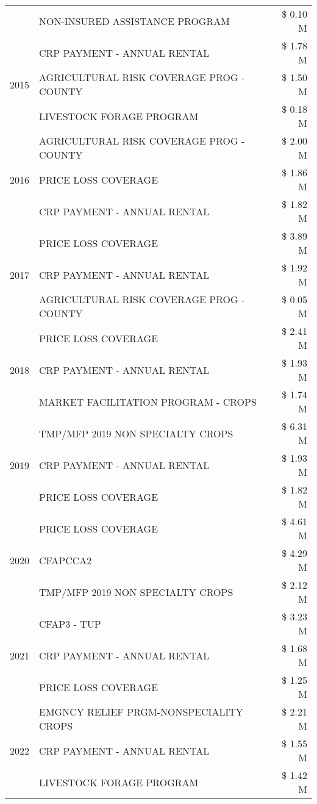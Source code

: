 \begin{tabular}{llr}
 & NON-INSURED ASSISTANCE PROGRAM & \$ 0.10 M \\
\cline{1-3}
\multirow[t]{3}{*}{2015} & CRP PAYMENT - ANNUAL RENTAL & \$ 1.78 M \\
 & AGRICULTURAL RISK COVERAGE PROG - COUNTY & \$ 1.50 M \\
 & LIVESTOCK FORAGE PROGRAM & \$ 0.18 M \\
\cline{1-3}
\multirow[t]{3}{*}{2016} & AGRICULTURAL RISK COVERAGE PROG - COUNTY & \$ 2.00 M \\
 & PRICE LOSS COVERAGE & \$ 1.86 M \\
 & CRP PAYMENT - ANNUAL RENTAL & \$ 1.82 M \\
\cline{1-3}
\multirow[t]{3}{*}{2017} & PRICE LOSS COVERAGE & \$ 3.89 M \\
 & CRP PAYMENT - ANNUAL RENTAL & \$ 1.92 M \\
 & AGRICULTURAL RISK COVERAGE PROG - COUNTY & \$ 0.05 M \\
\cline{1-3}
\multirow[t]{3}{*}{2018} & PRICE LOSS COVERAGE & \$ 2.41 M \\
 & CRP PAYMENT - ANNUAL RENTAL & \$ 1.93 M \\
 & MARKET FACILITATION PROGRAM - CROPS & \$ 1.74 M \\
\cline{1-3}
\multirow[t]{3}{*}{2019} & TMP/MFP 2019 NON SPECIALTY CROPS & \$ 6.31 M \\
 & CRP PAYMENT - ANNUAL RENTAL & \$ 1.93 M \\
 & PRICE LOSS COVERAGE & \$ 1.82 M \\
\cline{1-3}
\multirow[t]{3}{*}{2020} & PRICE LOSS COVERAGE & \$ 4.61 M \\
 & CFAPCCA2 & \$ 4.29 M \\
 & TMP/MFP 2019 NON SPECIALTY CROPS & \$ 2.12 M \\
\cline{1-3}
\multirow[t]{3}{*}{2021} & CFAP3 - TUP & \$ 3.23 M \\
 & CRP PAYMENT - ANNUAL RENTAL & \$ 1.68 M \\
 & PRICE LOSS COVERAGE & \$ 1.25 M \\
\cline{1-3}
\multirow[t]{3}{*}{2022} & EMGNCY RELIEF PRGM-NONSPECIALITY CROPS & \$ 2.21 M \\
 & CRP PAYMENT - ANNUAL RENTAL & \$ 1.55 M \\
 & LIVESTOCK FORAGE PROGRAM & \$ 1.42 M \\
\cline{1-3}
\bottomrule
\end{tabular}
